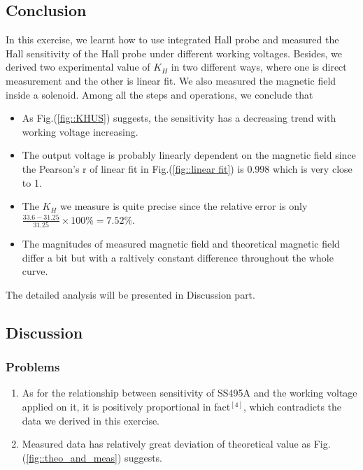 \documentclass[a4paper]{article}
\begin{document}
\subsection{Conclusion}

In this exercise, we learnt how to use integrated Hall probe and measured the Hall sensitivity of the Hall probe under different working voltages.
Besides, we derived two experimental value of $K_H$ in two different ways, where one is direct measurement and the other is linear fit.
We also measured the magnetic field inside a solenoid. Among all the steps and operations, we conclude that
\begin{itemize}
	\item As Fig.(\ref{fig::KHUS}) suggests, the sensitivity has a decreasing trend with working voltage increasing.
	\item The output voltage is probably linearly dependent on the magnetic field since the Pearson's r of linear fit
	      in Fig.(\ref{fig::linear fit}) is 0.998 which is very close to 1.
	\item The $K_H$ we measure is quite precise since the relative error is only $\frac{33.6-31.25}{31.25}\times 100\% = 7.52\%$.
	\item The magnitudes of measured magnetic field and theoretical magnetic field differ a bit but with a raltively constant difference throughout
		the whole curve.
\end{itemize}
\par The detailed analysis will be presented in Discussion part.

\subsection{Discussion}

\subsubsection{Problems}
\begin{enumerate}[1.]
	\item As for the relationship between sensitivity of SS495A and the working voltage applied on it, it is
		positively proportional in fact$^{[4]}$, which contradicts the data we derived in this exercise.
	\item Measured data has relatively great deviation of theoretical value as Fig.(\ref{fig::theo_and_meas})
		suggests.
\end{enumerate}
\end{document}
